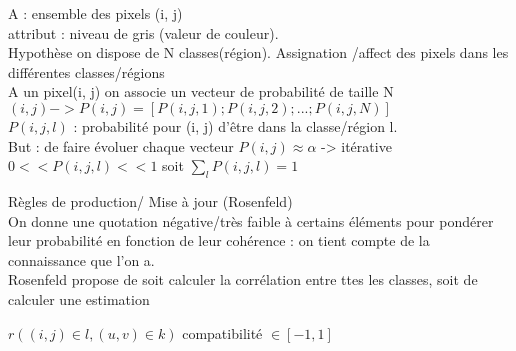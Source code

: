\documentclass[11pt]{article}
\begin{document}
\vskip 1cm
A : ensemble des pixels (i, j)\\
attribut : niveau de gris (valeur de couleur).\\
Hypothèse on dispose de N classes(région). Assignation /affect des pixels dans les différentes classes/régions\\

A un pixel(i, j) on associe un vecteur de probabilité de taille N\\
$(i, j) -> P(i, j) = [P(i, j,1); P(i, j, 2); ...; P(i, j, N)]$\\
$P(i, j, l)$ : probabilité pour (i, j) d'être dans la classe/région l.\\
But : de faire évoluer chaque vecteur $ P(i, j) \approx \alpha$ -> itérative\\
$0 << P(i, j, l) << 1$ soit $ \sum_l P(i, j, l) = 1$

\vskip 1cm 
Règles de production/ Mise à jour (Rosenfeld)\\
On donne une quotation négative/très faible à certains éléments pour pondérer leur probabilité en fonction de leur cohérence : on tient compte de la connaissance que l'on a.\\
Rosenfeld propose de soit calculer la corrélation entre ttes les classes, soit de calculer une estimation

$r((i, j) \in l, (u, v) \in k)$ compatibilité $\in [-1, 1]$\\
\end{document}
